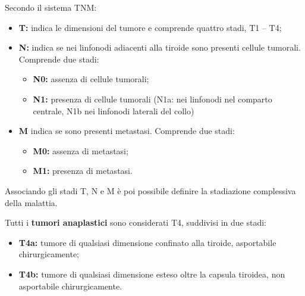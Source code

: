 \documentclass[10pt,a4paper]{report}
\begin{document}
Secondo il sistema TNM:
\begin{itemize}
\item \textbf{T:} indica le dimensioni del tumore e comprende quattro stadi, T1 – T4;
\item \textbf{N:} indica se nei linfonodi adiacenti alla tiroide sono presenti cellule tumorali. Comprende due stadi:
\begin{itemize}
\item \textbf{N0:} assenza di cellule tumorali;
\item \textbf{N1:} presenza di cellule tumorali (N1a: nei linfonodi nel comparto centrale, N1b nei linfonodi laterali del collo)
\end{itemize}
\item \textbf{M} indica se sono presenti metastasi. Comprende due stadi:
\begin{itemize}
\item \textbf{M0:} assenza di metastasi;
\item \textbf{M1:} presenza di metastasi.
\end{itemize}
\end{itemize}

Associando gli stadi T, N e M è poi possibile definire la stadiazione complessiva della malattia.

Tutti i \textbf{tumori anaplastici} sono considerati T4, suddivisi in due stadi:
\begin{itemize}

\item \textbf{T4a:} tumore di qualsiasi dimensione confinato alla tiroide, asportabile chirurgicamente;

\item \textbf{T4b:} tumore di qualsiasi dimensione esteso oltre la capsula tiroidea, non asportabile chirurgicamente.

\end{itemize}

\newpage
\end{document}
